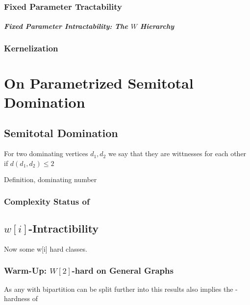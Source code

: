 \subsection{Fixed Parameter Tractability}
\paragraph{Fixed Parameter Intractability: The \hmath $W$ Hierarchy}
\subsection{Kernelization}


\chapter{On Parametrized Semitotal Domination}
\section{Semitotal Domination}

\sdom

For two dominating vertices $d_1, d_2$ we say that they are wittnesses for each other if $d(d_1, d_2) \leq 2$


Definition, dominating number

\subsection*{Complexity Status of \sdom}

\section{\hmath $w[i]$-Intractibility}

Now some  w[i] hard classes. 

\subsection{Warm-Up: \hmath $W[2]$-hard on General Graphs}


As any \bg with bipartition can be split further into \rpg this results also implies the \wone-hardness of \rpg

